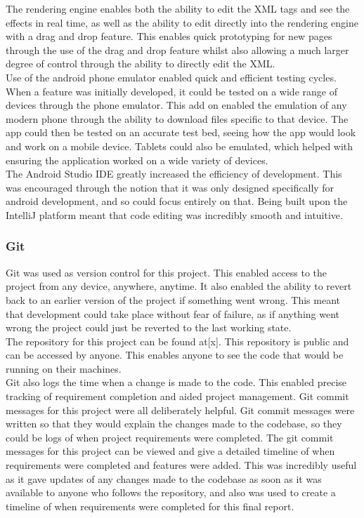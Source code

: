 \documentclass{article}
\begin{document}
The rendering engine enables both the ability to edit the XML tags and see the effects in real time, as well as the ability to edit directly into the rendering engine with a drag and drop feature. This enables quick prototyping for new pages through the use of the drag and drop feature whilst also allowing a much larger degree of control through the ability to directly edit the XML.\\

Use of the android phone emulator enabled quick and efficient testing cycles. When a feature was initially developed, it could be tested on a wide range of devices through the phone emulator. This add on enabled the emulation of any modern phone through the ability to download files specific to that device. The app could then be tested on an accurate test bed, seeing how the app would look and work on a mobile device. Tablets could also be emulated, which helped with ensuring the application worked on a wide variety of devices.\\

The Android Studio IDE greatly increased the efficiency of development. This was encouraged through the notion that it was only designed specifically for android development, and so could focus entirely on that. Being built upon the IntelliJ platform meant that code editing was incredibly smooth and intuitive. \\

\subsubsection{Git}

Git was used as version control for this project. This enabled access to the project from any device, anywhere, anytime. It also enabled the ability to revert back to an earlier version of the project if something went wrong. This meant that development could take place without fear of failure, as if anything went wrong the project could just be reverted to the last working state.\\

The repository for this project can be found at[x]. This repository is public and can be accessed by anyone. This enables anyone to see the code that would be running on their machines.\\

Git also logs the time when a change is made to the code. This enabled precise tracking of requirement completion and aided project management. Git commit messages for this project were all deliberately helpful. Git commit messages were written so that they would explain the changes made to the codebase, so they could be logs of when project requirements were completed. The git commit messages for this project can be viewed and give a detailed timeline of when requirements were completed and features were added. This was incredibly useful as it gave updates of any changes made to the codebase as soon as it was available to anyone who follows the repository, and also was used to create a timeline of when requirements were completed for this final report. \\
\end{document}
